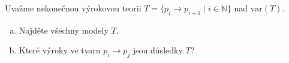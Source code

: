 \begin{problem}

    Uvažme nekonečnou výrokovou teorii $T=\{p_i \to p_{i+1}\mid i\in \mathbb{N}\}$ nad $\mathrm{var}(T)$. 
    \begin{enumerate}[(a)]
        \item Najděte všechny modely $T$.
        \item Které výroky ve tvaru  $p_i \to p_j$ jsou důsledky $T$?        
    \end{enumerate}

\end{problem}














